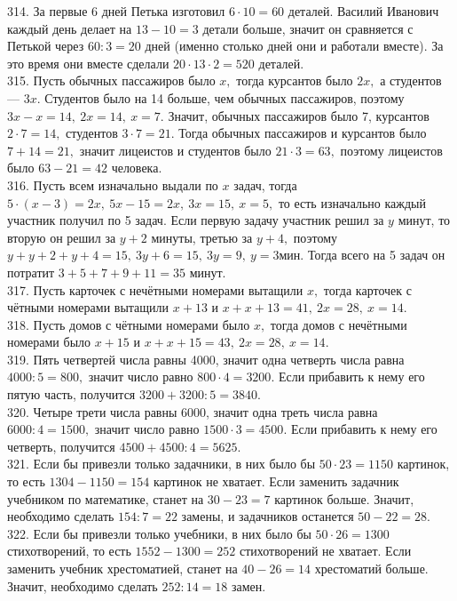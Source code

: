 314. За первые 6 дней Петька изготовил $6\cdot10=60$ деталей. Василий Иванович каждый день делает на $13-10=3$ детали больше, значит он сравняется с Петькой через $60:3=20$ дней (именно столько дней они и работали вместе). За это время они вместе сделали $20\cdot13\cdot2=520$ деталей.\\
315. Пусть обычных пассажиров было $x,$ тогда курсантов было $2x,$ а студентов --- $3x.$ Студентов было на 14 больше, чем обычных пассажиров, поэтому $3x-x=14,\ 2x=14,\ x=7.$ Значит, обычных пассажиров было 7, курсантов $2\cdot7=14,$ студентов $3\cdot7=21.$ Тогда обычных пассажиров и курсантов было $7+14=21,$ значит лицеистов и студентов было $21\cdot3=63,$ поэтому лицеистов было $63-21=42$ человека.\\
316. Пусть всем изначально выдали по $x$ задач, тогда $5\cdot(x-3)=2x,\ 5x-15=2x,\ 3x=15,\ x=5,$ то есть изначально каждый участник получил по 5 задач. Если первую задачу участник решил за $y$ минут, то вторую он решил за $y+2$ минуты, третью за $y+4,$ поэтому $y+y+2+y+4=15,\ 3y+6=15,\ 3y=9,\ y=3$мин. Тогда всего на 5 задач он потратит $3+5+7+9+11=35$ минут.\\
317. Пусть карточек с нечётными номерами вытащили $x,$ тогда карточек с чётными номерами вытащили $x+13$ и $x+x+13=41,\ 2x=28,\ x=14.$\\
318. Пусть домов с чётными номерами было $x,$ тогда домов с нечётными номерами было $x+15$ и $x+x+15=43,\ 2x=28,\ x=14.$\\
319. Пять четвертей числа равны 4000, значит одна четверть числа равна $4000:5=800,$ значит число равно $800\cdot4=3200.$ Если прибавить к нему его пятую часть, получится $3200+3200:5=3840.$\\
320. Четыре трети числа равны 6000, значит одна треть числа равна $6000:4=1500,$ значит число равно $1500\cdot3=4500.$ Если прибавить к нему его четверть, получится $4500+4500:4=5625.$\\
321. Если бы привезли только задачники, в них было бы $50\cdot23=1150$ картинок, то есть $1304-1150=154$ картинок не хватает. Если заменить задачник учебником по математике, станет на $30-23=7$ картинок больше. Значит, необходимо сделать $154:7=22$ замены, и задачников останется $50-22=28.$\\
322. Если бы привезли только учебники, в них было бы $50\cdot26=1300$ стихотворений, то есть $1552-1300=252$ стихотворений не хватает. Если заменить учебник хрестоматией, станет на $40-26=14$ хрестоматий больше. Значит, необходимо сделать $252:14=18$ замен.\\
